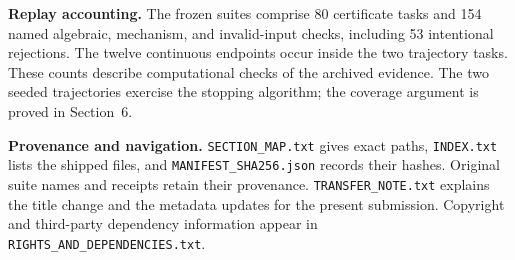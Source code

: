 \documentclass[11pt]{article}
\begin{document}
\textbf{Replay accounting.} The frozen suites comprise 80 certificate tasks and
154 named algebraic, mechanism, and invalid-input checks, including 53 intentional
rejections. The twelve continuous endpoints occur inside the two trajectory tasks.
These counts describe computational checks of the archived evidence. The two
seeded trajectories exercise the stopping algorithm; the coverage argument is
proved in Section~6.

\textbf{Provenance and navigation.} \texttt{SECTION\_MAP.txt} gives exact paths,
\texttt{INDEX.txt} lists the shipped files, and
\texttt{MANIFEST\_SHA256.json} records their hashes. Original suite names and
receipts retain their provenance. \texttt{TRANSFER\_NOTE.txt} explains the title
change and the metadata updates for the present submission. Copyright and third-party dependency information appear in
\nolinkurl{RIGHTS_AND_DEPENDENCIES.txt}.
\end{document}
